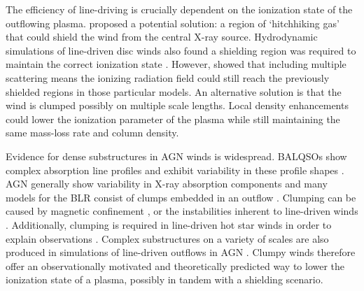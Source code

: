 \documentclass[preprint, a4paper, 11pt]{aastex}
\begin{document}
The efficiency of line-driving is crucially dependent on the ionization state 
of the outflowing plasma. \cite{MCGV95} proposed a potential solution: 
a region of `hitchhiking gas' that could shield the wind from the central X-ray source. 
Hydrodynamic simulations of line-driven disc winds also found a shielding region
was required to maintain the correct ionization state \citep{PSK2000,PK04}. 
However, \cite{H14} showed that including multiple scattering means the ionizing radiation 
field could still reach the previously shielded regions in those particular models.
An alternative solution is that the wind is clumped \citep[e.g.][]{hamann2013}
possibly on multiple scale lengths. Local density enhancements could lower the 
ionization parameter of the plasma while still maintaining the same mass-loss 
rate and column density. 


Evidence for dense substructures in AGN winds is widespread.
BALQSOs show complex absorption line profiles \citep{ganguly2006, simonhamann2010}
and exhibit variability in these profile shapes \citep{capellupo2011,capellupo2012,capellupo2014}.
AGN generally show variability in X-ray absorption components \citep[e.g.][]{risaliti2002}
and many models for the BLR consist of clumps embedded in an outflow 
\citep{krolik1981, emmering1992, dekool1995, cassidyraine1996}.
Clumping can be caused by magnetic confinement \cite{dekool1995},
or the instabilities inherent to line-driven winds 
\citep{lucysolomon1970,macgregor1979,carlberg1980,owockirybicki1984,owockirybicki1985}.
Additionally, clumping is required in line-driven hot star winds 
in order to explain observations \citep{hillier1991eswingsmodel}. Complex substructures 
on a variety of scales are also produced in simulations of line-driven 
outflows in AGN \citep{PSK2000,PK04,progakurosawa2010,proga2014}.
Clumpy winds therefore offer an observationally motivated and theoretically 
predicted way to lower the ionization state of a plasma, possibly in tandem
with a shielding scenario. 




\end{document}
